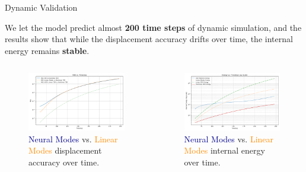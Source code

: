 \documentclass[9pt]{beamer}
\begin{document}
\begin{frame}{Dynamic Validation}
    
    We let the model predict almost \textbf{200 time steps} of dynamic simulation, and the results show that while the displacement accuracy drifts over time, the internal energy remains \textbf{stable}.
    \vspace{-1em}
        
    \begin{columns}[T]
        \begin{column}{0.5\textwidth}
            \begin{figure}
                \includegraphics[width=\textwidth]{Images/beam_dynamic_mse.png}
                                \caption{\textcolor{darkblue}{Neural Modes} vs. \textcolor{darkorange}{Linear Modes} displacement accuracy over time.}
            \end{figure}
        \end{column}
        
        \begin{column}{0.5\textwidth}
            \begin{figure}
                \includegraphics[width=\textwidth]{Images/beam_dynamic_energy.png}
                \caption{\textcolor{darkblue}{Neural Modes} vs. \textcolor{darkorange}{Linear Modes} internal energy over time.}
            \end{figure}
        \end{column}
    \end{columns}
\end{frame}
\end{document}
